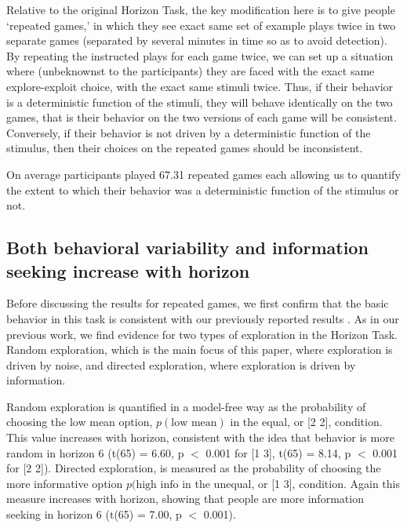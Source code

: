 \documentclass[12pt]{article}
\begin{document}
	Relative to the original Horizon Task, the key modification here is to give people `repeated games,' in which they see exact same set of example plays twice in two separate games (separated by several minutes in time so as to avoid detection). By repeating the instructed plays for each game twice, we can set up a situation where (unbeknownst to the participants) they are faced with the exact same explore-exploit choice, with the exact same stimuli twice. Thus, if their behavior is a deterministic function of the stimuli, they will behave identically on the two games, that is their behavior on the two versions of each game will be consistent. Conversely, if their behavior is not driven by a deterministic function of the stimulus, then their choices on the repeated games should be inconsistent.
	
	On average participants played 67.31 repeated games each allowing us to quantify the extent to which their behavior was a deterministic function of the stimulus or not.
	
	
	

	\subsection*{Both behavioral variability and information seeking increase with horizon}
	
	Before discussing the results for repeated games, we first confirm that the basic behavior in this task is consistent with our previously reported results \citep{wilson2014}. As in our previous work, we find evidence for two types of exploration in the Horizon Task.  Random exploration, which is the main focus of this paper, where exploration is driven by noise, and directed exploration, where exploration is driven by information. 
	
	Random exploration is quantified in a model-free way as the probability of choosing the low mean option, $p(\mbox{low mean})$ in the equal, or [2 2], condition. This value increases with horizon, consistent with the idea that behavior is more random in horizon 6 (t(65) = 6.60, p $<$ 0.001 for [1 3], t(65) = 8.14, p $<$ 0.001 for [2 2]).  Directed exploration, is measured as the probability of choosing the more informative option $p(\mbox{high info}$ in the unequal, or [1 3], condition. Again this measure increases with horizon, showing that people are more information seeking in horizon 6 (t(65) = 7.00, p $<$ 0.001).
	
\end{document}
